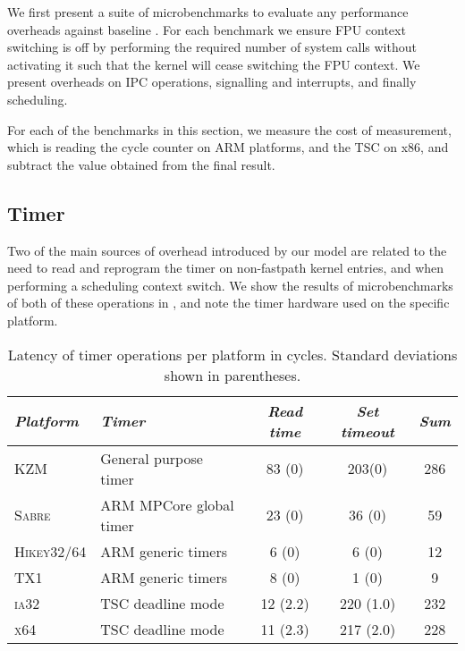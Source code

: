 We first present a suite of microbenchmarks to evaluate any performance overheads against baseline
\selfour.
For each benchmark we ensure \gls{FPU} context switching is off by performing the required number of 
system calls 
without activating it such that the kernel will cease switching the FPU context. We present
overheads on IPC operations, signalling and interrupts, and finally scheduling. 

For each of the benchmarks in this section, we measure the cost of measurement, which is reading the
cycle counter on ARM platforms, and the \gls{TSC} on x86, and subtract the value obtained
from the final result.

\subsection{Timer}
\label{s:eval-timer}

Two of the main sources of overhead introduced by our model are related to the need to read and
reprogram the timer on non-fastpath kernel entries, and when performing a scheduling context switch.
We show the results of microbenchmarks of both of these operations in , and
note the timer hardware used on the specific platform. 

\begin{table}[b]\centering
{}
\begin{tabularx}{\textwidth}{lXccc}\toprule
    \emph{Platform} & \emph{Timer} & \emph{Read time} & \emph{Set timeout} & \emph{Sum}
    \\\midrule
    \textsc{KZM}               & General purpose timer    & 83 (0)   & 203(0)  & 286   \\
    \textsc{Sabre}             & ARM MPCore global timer  & 23 (0)   & 36 (0)  & 59    \\
    \textsc{Hikey32/64}        & ARM generic timers       &  6 (0)   &  6 (0)  & 12    \\
    \textsc{TX1}               & ARM generic timers       &  8 (0)   &  1 (0)  & 9     \\
    \textsc{ia32}              & TSC deadline mode        & 12 (2.2) & 220 (1.0) & 232 \\
    \textsc{x64}               & TSC deadline mode        & 11 (2.3) & 217 (2.0) & 228 \\
    \bottomrule\hline
\end{tabularx}
\caption[Latency of timer operations.]{Latency of timer operations per platform in cycles. Standard deviations shown
in parentheses.}
\label{t:evaluation-timer}
\end{table}

